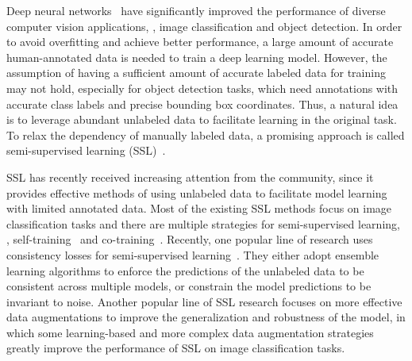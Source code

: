 \documentclass[final]{cvpr}
\begin{document}
Deep neural networks~\cite{krizhevsky2012imagenet,simonyan2014very,he2016deep} have significantly improved the performance of diverse computer vision applications, \eg, image classification and object detection. In order to avoid overfitting and achieve better performance, a large amount of accurate human-annotated data is needed to train a deep learning model. However, the assumption of having a sufficient amount of accurate labeled data for training may not hold, especially for object detection tasks, which need annotations with accurate class labels and precise bounding box coordinates. Thus, a natural idea is to leverage abundant unlabeled data to facilitate learning in the original task. To relax the dependency of manually labeled data, a promising approach is called semi-supervised learning (SSL)~\cite{chapelle2010semi}.

SSL has recently received increasing attention from the community, since it provides effective methods of using unlabeled data to facilitate model learning with limited annotated data. Most of the existing SSL methods focus on image classification tasks and there are multiple strategies for semi-supervised learning, \eg, self-training~\cite{scudder1965probability,xie2020self} and co-training~\cite{blum1998combining,qiao2018deep}. Recently, one popular line of research uses consistency losses for semi-supervised learning~\cite{lee2013pseudo,rasmus2015semi,laine2016temporal,tarvainen2017mean,miyato2018virtual,sajjadi2016regularization,tarvainenweight,xie2019unsupervised,berthelot2019mixmatch,berthelot2019remixmatch,sohn2020fixmatch}. They either adopt ensemble learning algorithms to enforce the predictions of the unlabeled data to be consistent across multiple models, or constrain the model predictions to be invariant to noise. Another popular line of SSL research focuses on more effective data augmentations to improve the generalization and robustness of the model, in which some learning-based and more complex data augmentation strategies \cite{berthelot2019remixmatch,xie2019unsupervised,cubuk2019randaugment,berthelot2019mixmatch,sohn2020fixmatch} greatly improve the performance of SSL on image classification tasks.
\end{document}
